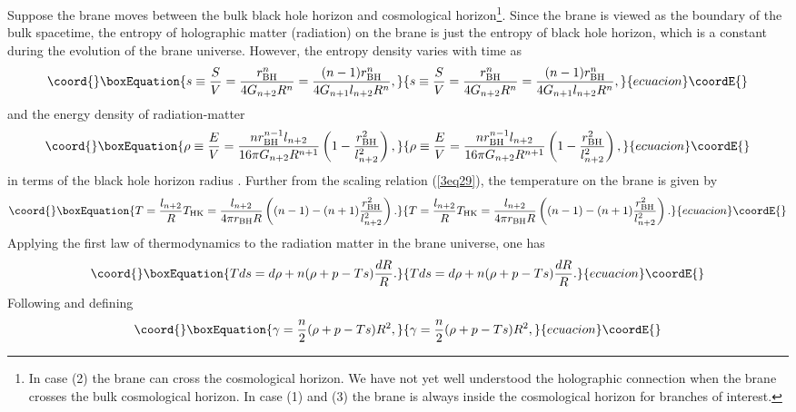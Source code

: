 \documentclass[a4paper,12pt]{article}
\begin{document}
Suppose the brane moves between the bulk black hole horizon and
cosmological horizon\footnote{In case (2) the brane can cross the
cosmological horizon. We have not yet well understood the
holographic connection when the brane crosses the bulk cosmological horizon. 
In case (1) and (3) the
brane is always inside the cosmological horizon for branches of
interest.}. Since the brane is viewed as the boundary of the bulk
spacetime, the entropy of holographic matter (radiation)
on the brane is just the entropy of black hole horizon, which is a
constant during the evolution of the brane universe. However, the
entropy density varies with time as
\begin{equation}\coord{}\boxEquation{
\label{3eq31}
 s \equiv \frac{S}{V}=\frac{r_{\rm BH}^n}{4G_{n+2}R^n}
    =\frac{(n-1)r_{\rm BH}^n}{4G_{n+1}l_{n+2}R^n},
}{
s \equiv \frac{S}{V}=\frac{r_{\rm BH}^n}{4G_{n+2}R^n}
    =\frac{(n-1)r_{\rm BH}^n}{4G_{n+1}l_{n+2}R^n},
}{ecuacion}\coordE{}\end{equation}
and the energy density of radiation-matter
\begin{equation}\coord{}\boxEquation{
\rho \equiv \frac{E}{V}=\frac{n r_{\rm BH}^{n-1}l_{n+2}}{16\pi G_{n+2}
R^{n+1}} \left (1-\frac{r_{\rm BH}^2}{l^2_{n+2}}\right),
}{
\rho \equiv \frac{E}{V}=\frac{n r_{\rm BH}^{n-1}l_{n+2}}{16\pi G_{n+2}
R^{n+1}} \left (1-\frac{r_{\rm BH}^2}{l^2_{n+2}}\right),
}{ecuacion}\coordE{}\end{equation}
in terms of the black hole horizon radius \coordHE{}. Further from the
scaling relation (\ref{3eq29}), the temperature \coordHE{} on
the brane is given by
\begin{equation}\coord{}\boxEquation{
\label{3eq33}
 T=\frac{l_{n+2}}{R}T_{\rm HK}=\frac{l_{n+2}}{4\pi
  r_{\rm BH}R}\left((n-1)-(n+1)\frac{r_{\rm BH}^2}{l^2_{n+2}}\right).
}{
T=\frac{l_{n+2}}{R}T_{\rm HK}=\frac{l_{n+2}}{4\pi
  r_{\rm BH}R}\left((n-1)-(n+1)\frac{r_{\rm BH}^2}{l^2_{n+2}}\right).
}{ecuacion}\coordE{}\end{equation}
Applying the first law of thermodynamics to the radiation matter
in the brane universe, one has
\begin{equation}\coord{}\boxEquation{
Tds = d\rho +n(\rho +p -T s)\frac{dR}{R}.
}{
Tds = d\rho +n(\rho +p -T s)\frac{dR}{R}.
}{ecuacion}\coordE{}\end{equation}
Following \cite{SV} and defining
\begin{equation}\coord{}\boxEquation{
\gamma = \frac{n}{2}(\rho +p -Ts)R^2,
}{
\gamma = \frac{n}{2}(\rho +p -Ts)R^2,
}{ecuacion}\coordE{}\end{equation}
\end{document}
